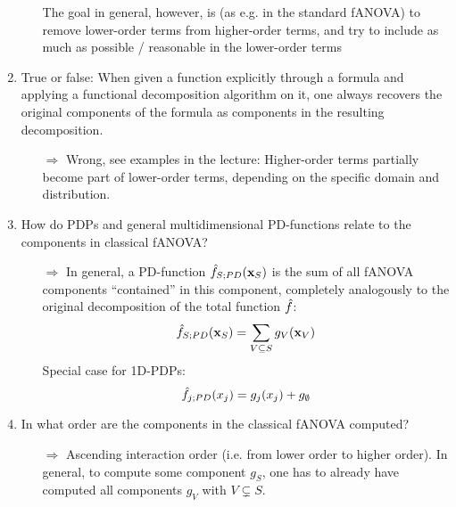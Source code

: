 \begin{enumerate}
\begin{itemize}
        The goal in general, however, is (as e.g. in the standard fANOVA) to remove lower-order terms from higher-order terms, and try to include as much as possible / reasonable in the lower-order terms
    \end{itemize}
    \item 
    True or false: When given a function explicitly through a formula and applying a functional decomposition algorithm on it, one always recovers the original components of the formula as components in the resulting decomposition.
    \begin{itemize}
        \item[$\Rightarrow$] Wrong, see examples in the lecture: Higher-order terms partially become part of lower-order terms, depending on the specific domain and distribution.
    \end{itemize}
    \item 
    How do PDPs and general multidimensional PD-functions relate to the components in classical fANOVA?
    \begin{itemize}
        \item[$\Rightarrow$] In general, a PD-function
        $\hat{f}_{S;PD}(\mathbf{x}_S)$
        is the sum of all fANOVA components ``contained'' in this component, completely analogously to the original decomposition of the total function $\hat{f}$:
        $$ \hat{f}_{S;PD}(\mathbf{x}_S) = \sum_{V \subseteq S} g_V(\mathbf{x}_V)$$
        Special case for 1D-PDPs:
        $$ \hat{f}_{j;PD}(x_j) = g_j(x_j) + g_\emptyset$$
    \end{itemize}
    \item 
    In what order are the components in the classical fANOVA computed?
    \begin{itemize}
        \item[$\Rightarrow$] Ascending interaction order (i.e. from lower order to higher order).
        In general, to compute some component $g_S$, one has to already have computed all components $g_V$ with $V \subsetneq S$.


\end{itemize}
\end{enumerate}
